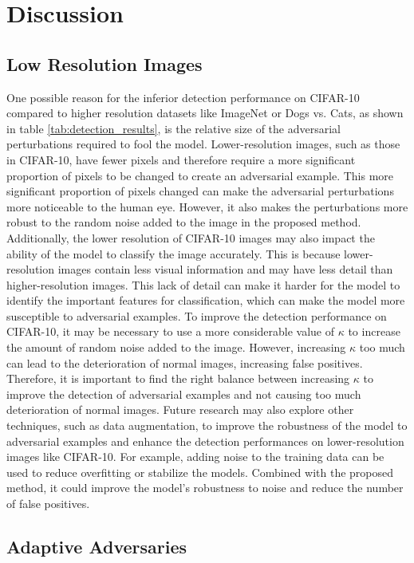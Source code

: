 \chapter{Discussion}
\label{discussion}
\overridetextsize

\section{Low Resolution Images}

One possible reason for the inferior detection performance on CIFAR-10 compared
to higher resolution datasets like ImageNet or Dogs vs. Cats, as shown in table
\ref{tab:detection_results}, is the relative size of the adversarial
perturbations required to fool the model. Lower-resolution images, such as those
in CIFAR-10, have fewer pixels and therefore require a more significant
proportion of pixels to be changed to create an adversarial example. This more
significant proportion of pixels changed can make the adversarial perturbations
more noticeable to the human eye. However, it also makes the perturbations more
robust to the random noise added to the image in the proposed method.
Additionally, the lower resolution of CIFAR-10 images may also impact the
ability of the model to classify the image accurately. This is because
lower-resolution images contain less visual information and may have less detail
than higher-resolution images. This lack of detail can make it harder for the
model to identify the important features for classification, which can make the
model more susceptible to adversarial examples. To improve the detection
performance on CIFAR-10, it may be necessary to use a more considerable value of
$\kappa$ to increase the amount of random noise added to the image. However,
increasing $\kappa$ too much can lead to the deterioration of normal images,
increasing false positives. Therefore, it is important to find the right balance
between increasing $\kappa$ to improve the detection of adversarial examples and
not causing too much deterioration of normal images. Future research may also
explore other techniques, such as data augmentation, to improve the robustness
of the model to adversarial examples and enhance the detection performances on
lower-resolution images like CIFAR-10. For example, adding noise to the training
data can be used to reduce overfitting or stabilize the models. Combined with
the proposed method, it could improve the model's robustness to noise and reduce
the number of false positives.

\section{Adaptive Adversaries}

